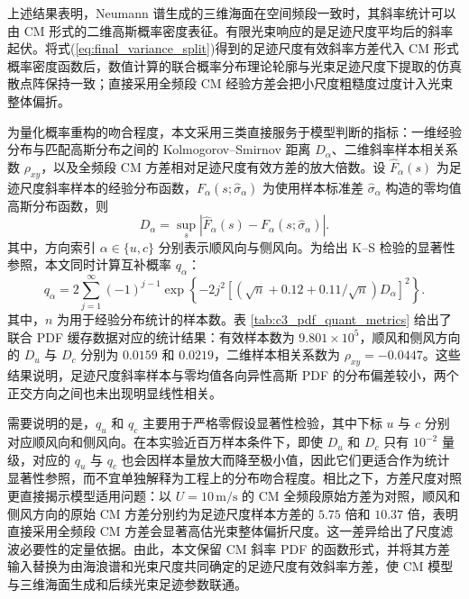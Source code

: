 上述结果表明，Neumann 谱生成的三维海面在空间频段一致时，其斜率统计可以由 CM 形式的二维高斯概率密度表征。有限光束响应的是足迹尺度平均后的斜率起伏。将式(\ref{eq:final_variance_split})得到的足迹尺度有效斜率方差代入 CM 形式概率密度函数后，数值计算的联合概率分布理论轮廓与光束足迹尺度下提取的仿真散点阵保持一致；直接采用全频段 CM 经验方差会把小尺度粗糙度过度计入光束整体偏折。

为量化概率重构的吻合程度，本文采用三类直接服务于模型判断的指标：一维经验分布与匹配高斯分布之间的 Kolmogorov--Smirnov 距离 $D_\alpha$、二维斜率样本相关系数 $\rho_{xy}$，以及全频段 CM 方差相对足迹尺度有效方差的放大倍数。设 $\hat F_\alpha(s)$ 为足迹尺度斜率样本的经验分布函数，$F_\alpha(s;\hat\sigma_\alpha)$ 为使用样本标准差 $\hat\sigma_\alpha$ 构造的零均值高斯分布函数，则
\[
D_\alpha=\sup_s\left|\hat F_\alpha(s)-F_\alpha(s;\hat\sigma_\alpha)\right|.
\]
其中，方向索引 $\alpha\in\{u,c\}$ 分别表示顺风向与侧风向。为给出 K--S 检验的显著性参照，本文同时计算互补概率 $q_\alpha$：
\[
q_\alpha=2\sum_{j=1}^{\infty}(-1)^{j-1}
\exp\left\{-2j^2\left[(\sqrt{n}+0.12+0.11/\sqrt{n})D_\alpha\right]^2\right\}.
\]
其中，$n$ 为用于经验分布统计的样本数。表 \ref{tab:c3_pdf_quant_metrics} 给出了联合 PDF 缓存数据对应的统计结果：有效样本数为 $9.801\times10^5$，顺风和侧风方向的 $D_u$ 与 $D_c$ 分别为 $0.0159$ 和 $0.0219$，二维样本相关系数为 $\rho_{xy}=-0.0447$。这些结果说明，足迹尺度斜率样本与零均值各向异性高斯 PDF 的分布偏差较小，两个正交方向之间也未出现明显线性相关。

需要说明的是，$q_u$ 和 $q_c$ 主要用于严格零假设显著性检验，其中下标 $u$ 与 $c$ 分别对应顺风向和侧风向。在本实验近百万样本条件下，即使 $D_u$ 和 $D_c$ 只有 $10^{-2}$ 量级，对应的 $q_u$ 与 $q_c$ 也会因样本量放大而降至极小值，因此它们更适合作为统计显著性参照，而不宜单独解释为工程上的分布吻合程度。相比之下，方差尺度对照更直接揭示模型适用问题：以 $U=10\,\mathrm{m/s}$ 的 CM 全频段原始方差为对照，顺风和侧风方向的原始 CM 方差分别约为足迹尺度样本方差的 $5.75$ 倍和 $10.37$ 倍，表明直接采用全频段 CM 方差会显著高估光束整体偏折尺度。这一差异给出了尺度滤波必要性的定量依据。由此，本文保留 CM 斜率 PDF 的函数形式，并将其方差输入替换为由海浪谱和光束尺度共同确定的足迹尺度有效斜率方差，使 CM 模型与三维海面生成和后续光束足迹参数联通。

